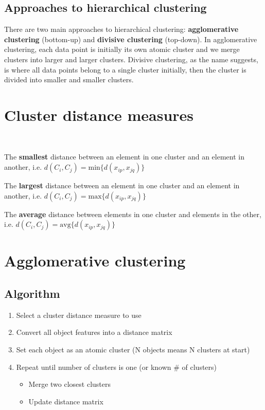 \documentclass[11pt,fleqn]{book} %
\begin{document}
\subsection*{Approaches to hierarchical clustering}
There are two main approaches to hierarchical clustering: \textbf{agglomerative clustering} (bottom-up) and \textbf{divisive clustering} (top-down). In agglomerative clustering, each data point is initially its own atomic cluster and we merge clusters into larger and larger clusters. Divisive clustering, as the name suggests, is where all data points belong to a single cluster initially, then the cluster is divided into smaller and smaller clusters.

\section{Cluster distance measures}
\ 
\begin{definition}[Single link]
	The \textbf{smallest} distance between an element in one cluster and an element in another, i.e. $d(C_i, C_j) = \text{min}\{d(x_{ip}, x_{jq})\}$ 
\end{definition}

\begin{definition}[Complete link]
	The \textbf{largest} distance between an element in one cluster and an element in another, i.e. $d(C_i, C_j) = \text{max}\{d(x_{ip}, x_{jq})\}$ 
\end{definition}

\begin{definition}[Average]
	The \textbf{average} distance between elements in one cluster and elements in the other, i.e. $d(C_i, C_j) = \text{avg}\{d(x_{ip}, x_{jq})\}$ 
\end{definition}

\newpage
\section{Agglomerative clustering}
\subsection*{Algorithm}
\begin{enumerate}
	\item Select a cluster distance measure to use
	\item Convert all object features into a distance matrix
	\item Set each object as an atomic cluster (N objects means N clusters at start)
	\item Repeat until number of clusters is one (or known \# of clusters)
	\begin{itemize}
		\item Merge two closest clusters
		\item Update distance matrix
	\end{itemize}
\end{enumerate}
\end{document}
